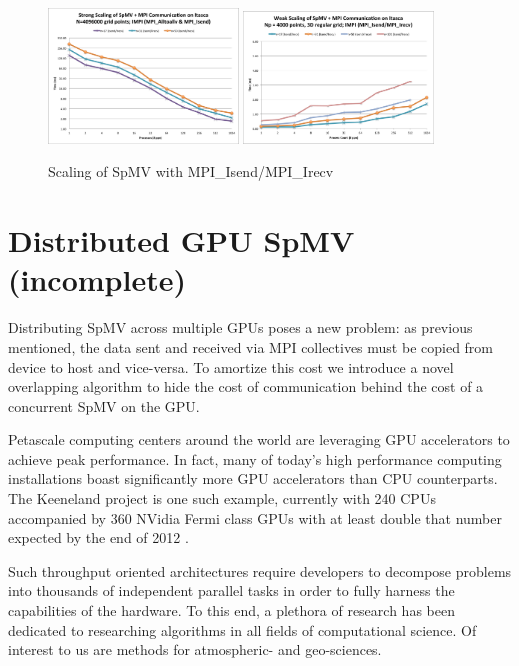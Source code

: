 \documentclass{report}
\begin{document}
\begin{figure}
\centering
\includegraphics[width=0.45\textwidth]{performance_content/scaling/strong_scaling_4M_regular_isend.png}  
\includegraphics[width=0.45\textwidth]{performance_content/scaling/weak_scaling_np4000_regular_isend.png}  
\caption{Scaling of SpMV with MPI\_Isend/MPI\_Irecv}
\end{figure}


\chapter{Distributed GPU SpMV (incomplete)}
\label{chap:multigpu_rbffd}

Distributing SpMV across multiple GPUs poses a new problem: as previous mentioned, the data sent and received via MPI collectives must be copied from device to host and vice-versa. To amortize this cost we introduce a novel overlapping algorithm to hide the cost of communication behind the cost of a concurrent SpMV on the GPU. 


Petascale computing centers around the world are leveraging GPU accelerators to achieve peak performance. In fact, many of today's high performance computing installations boast significantly more GPU accelerators than CPU counterparts. The Keeneland project is one such example, currently with 240 CPUs accompanied by 360 NVidia Fermi class GPUs with at least double that number expected by the end of 2012 \cite{Vetter2011}. 

Such throughput oriented architectures require developers to decompose problems into thousands of independent parallel tasks in order to fully harness the capabilities of the hardware. To this end, a plethora of research has been dedicated to researching algorithms in all fields of computational science. Of interest to us are methods for atmospheric- and geo-sciences. 
\end{document}
